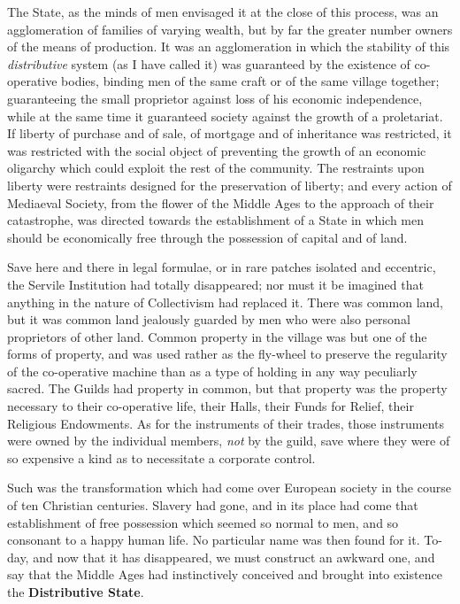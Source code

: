 \documentclass{book}
\newcommand\mdstrong[1]{\textbf{#1}}
\begin{document}
The State, as the minds of men envisaged it at the close of this process, was an agglomeration of families of varying wealth, but by far the greater number owners of the means of production. It was an agglomeration in which the stability of this \emph{distributive} system (as I have called it) was guaranteed by the existence of co-operative bodies, binding men of the same craft or of the same village together; guaranteeing the small proprietor against loss of his economic independence, while at the same time it guaranteed society against the growth of a proletariat. If liberty of purchase and of sale, of mortgage and of inheritance was restricted, it was restricted with the social object of preventing the growth of an economic oligarchy which could exploit the rest of the community. The restraints upon liberty were restraints designed for the preservation of liberty; and every action of Mediaeval Society, from the flower of the Middle Ages to the approach of their catastrophe, was directed towards the establishment of a State in which men should be economically free through the possession of capital and of land.

Save here and there in legal formulae, or in rare patches isolated and eccentric, the Servile Institution had totally disappeared; nor must it be imagined that anything in the nature of Collectivism had replaced it. There was common land, but it was common land jealously guarded by men who were also personal proprietors of other land. Common property in the village was but one of the forms of property, and was used rather as the fly-wheel to preserve the regularity of the co-operative machine than as a type of holding in any way peculiarly sacred. The Guilds had property in common, but that property was the property necessary to their co-operative life, their Halls, their Funds for Relief, their Religious Endowments. As for the instruments of their trades, those instruments were owned by the individual members, \emph{not} by the guild, save where they were of so expensive a kind as to necessitate a corporate control.

Such was the transformation which had come over European society in the course of ten Christian centuries. Slavery had gone, and in its place had come that establishment of free possession which seemed so normal to men, and so consonant to a happy human life. No particular name was then found for it. To-day, and now that it has disappeared, we must construct an awkward one, and say that the Middle Ages had instinctively conceived and brought into existence the \mdstrong{Distributive State}.
\end{document}
